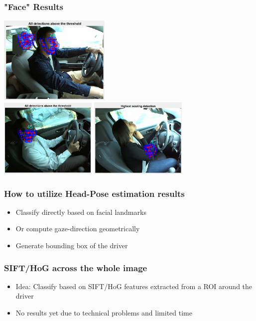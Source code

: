 \documentclass{beamer}
\begin{document}
	\begin{frame}
		\frametitle{"Face" Results}
		\begin{center}
			\includegraphics[width=0.4\textwidth]{faces/face3} \\ \vspace{0.1cm}
			\includegraphics[width=0.35\textwidth]{faces/face5} \hspace{0.1cm}
			\includegraphics[width=0.35\textwidth]{faces/face7}
		\end{center}		
	\end{frame}
	
	\begin{frame}
		\frametitle{How to utilize Head-Pose estimation results}
		\begin{itemize}
			\item Classify directly based on facial landmarks
			\item Or compute gaze-direction geometrically
			\item Generate bounding box of the driver
		\end{itemize}
	\end{frame}
	
	\begin{frame}
		\frametitle{SIFT/HoG across the whole image}
		
		\begin{itemize}
			\item Idea: Classify based on SIFT/HoG features extracted from a ROI around the driver
			\item No results yet due to technical problems and limited time
		\end{itemize}
	\end{frame}
	
	
    

	
	
\end{document}
